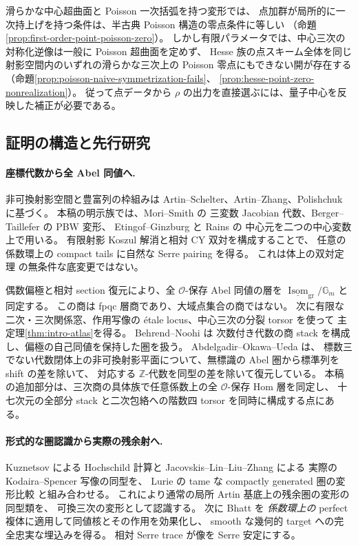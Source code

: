 \documentclass[11pt,a4paper]{ltjsarticle}
\numberwithin{equation}{section}
\begin{document}
滑らかな中心超曲面と Poisson 一次括弧を持つ変形では、
点加群が局所的に一次持上げを持つ条件は、半古典 Poisson 構造の零点条件に等しい
（命題\ref{prop:first-order-point-poisson-zero}）。
しかし有限パラメータでは、中心三次の対称化逆像は一般に Poisson 超曲面を定めず、
Hesse 族の点スキーム全体を同じ射影空間内のいずれの滑らかな三次上の
Poisson 零点にもできない開が存在する
（命題\ref{prop:poisson-naive-symmetrization-fails}、
\ref{prop:hesse-point-zero-nonrealization}）。
従って点データから $\rho$ の出力を直接選ぶには、量子中心を反映した補正が必要である。

\subsection{証明の構造と先行研究}

\paragraph{座標代数から全 Abel 同値へ.}
非可換射影空間と豊富列の枠組みは Artin--Schelter、Artin--Zhang、Polishchuk
\cite{AS,AZ,PolishchukProj}に基づく。
本稿の明示族では、Mori--Smith \cite[Theorem~4.2(1)]{MS} の
三変数 Jacobian 代数、Berger--Taillefer \cite{BT} の PBW 変形、
Etingof--Ginzburg と Rains \cite[Proposition~7.3.1(ii) and \S9.1]{EG} の
中心元を二つの中心変数上で用いる。
有限射影 Koszul 解消と相対 CY 双対を構成することで、
任意の係数環上の compact tails に自然な Serre pairing を得る。
これは体上の双対定理 \cite{YZ,RRGeneralizedAS} の無条件な底変更ではない。

偶数偏極と相対 section 復元により、全 $\mathcal O$-保存 Abel 同値の層を
$\underline{\operatorname{Isom}}_{\mathrm{gr}}/\mathbb G_m$ と同定する。
この商は fpqc 層商であり、大域点集合の商ではない。
次に有限な二次・三次関係窓、作用写像の étale locus、中心三次の分裂 torsor を使って
主定理\ref{thm:intro-atlas}を得る。
Behrend--Noohi \cite[\S\S2.3,2.5,3.1.2]{BehrendNoohiModuli} は
次数付き代数の商 stack を構成し、偏極の自己同値を保持した圏を扱う。
Abdelgadir--Okawa--Ueda \cite[Theorem~7.3, Theorem~A.8 and Corollary~A.10]{AOUNCPlanes} は、
標数三でない代数閉体上の非可換射影平面について、無標識の Abel 圏から標準列を shift の差を除いて、
対応する $\mathbb Z$-代数を同型の差を除いて復元している。
本稿の追加部分は、三次商の具体族で任意係数上の全 $\mathcal O$-保存 Hom 層を同定し、
十七次元の全部分 stack と二次包絡への階数四 torsor を同時に構成する点にある。

\paragraph{形式的な圏認識から実際の残余射へ.}
Kuznetsov \cite[Theorem~8.9]{KuznetsovHochschild} による Hochschild 計算と
Jacovskis--Lin--Liu--Zhang \cite[Theorem~4.4(2)]{JLLZInfinitesimal} による
実際の Kodaira--Spencer 写像の同型を、
Lurie の tame な compactly generated 圏の変形比較
\cite[Theorems~5.1.9,5.3.16 and Proposition~5.3.21]{LurieDAGX}と組み合わせる。
これにより通常の局所 Artin 基底上の残余圏の変形の同型類を、
可換三次の変形として認識する。
次に Bhatt \cite[Lemma~4.2]{BhattAlgebraization} を
\emph{係数環上の} perfect 複体に適用して同値核とその作用を効果化し、
smooth な幾何的 target への完全忠実な埋込みを得る。
相対 Serre trace が像を Serre 安定にする。
\end{document}
